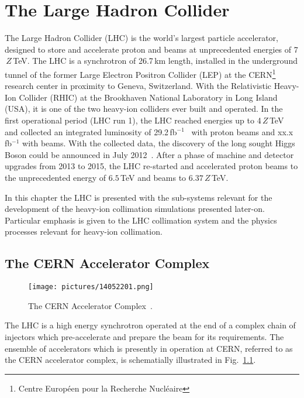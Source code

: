 \chapter{The Large Hadron Collider}\label{thelhc}
%
%
The Large Hadron Collider (LHC) is the world's largest particle accelerator, designed to store and accelerate proton and \lead beams at unprecedented energies of 7$\,Z\,$TeV. The LHC is a synchrotron of 26.7\,km length, installed in the underground tunnel of the former Large Electron Positron Collider (LEP) at the CERN\footnote{Centre Europ\'{e}en pour la Recherche Nucl\'{e}aire} research center in proximity to Geneva, Switzerland. With the Relativistic Heavy-Ion Collider (RHIC) at the Brookhaven National Laboratory in Long Island (USA), it is one of the two heavy-ion colliders ever built and operated\cite{Fischer2014}. In the first operational period (LHC run 1), the LHC reached energies up to 4$\,Z\,$TeV and collected an integrated luminosity of 29.2\,fb$^{-1}$~\cite{lamont_moyab101} with proton beams and xx.x\,fb$^{-1}$ with \lead beams. With the collected data, the discovery of the long sought Higgs Boson could be announced in July 2012~\cite{higgs:ATLAS,higgs:CMS}. After a phase of machine and detector upgrades from 2013 to 2015, the LHC re-started and accelerated proton beams to the unprecedented energy of $6.5\,$TeV and \lead beams to $6.37\,Z\,$TeV.
%

In this chapter the LHC is presented with the sub-systems relevant for the development of the heavy-ion collimation simulations presented later-on. Particular emphasis is given to the LHC collimation system and the physics processes relevant for heavy-ion collimation.

%
\section{The CERN Accelerator Complex}
%
  \begin{figure}[t]
    \centering
    \texttt{[image: pictures/14052201.png]}
    \caption{ The CERN Accelerator Complex~\cite{Christiane:1260465}.}  
    \label{pic:14052201}
  \end{figure}
%
The LHC is a high energy synchrotron operated at the end of a complex chain of injectors which pre-accelerate and prepare the beam for its requirements. The ensemble of accelerators which is presently in operation at CERN, referred to as the CERN accelerator complex, is schematially illustrated in Fig.~\ref{pic:14052201}. 

